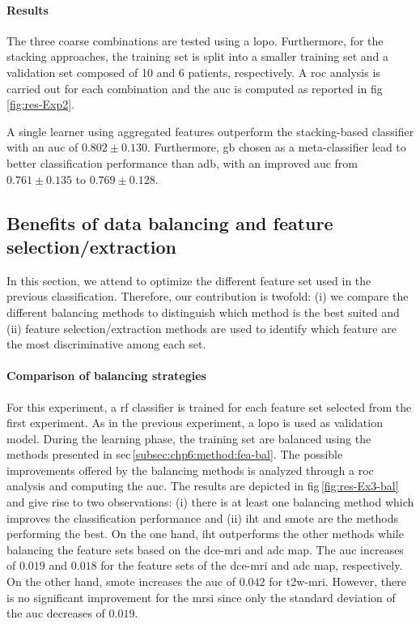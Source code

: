 \paragraph{Results}
The three coarse combinations are tested using a \ac{lopo}.
Furthermore, for the stacking approaches, the training set is split into a smaller training set and a validation set composed of 10 and 6 patients, respectively.
A \ac{roc} analysis is carried out for each combination and the \ac{auc} is computed as reported in \acs{fig}\,\ref{fig:res-Exp2}.

A single learner using aggregated features outperform the stacking-based classifier with an \ac{auc} of $0.802 \pm 0.130$.
Furthermore, \ac{gb} chosen as a meta-classifier lead to better classification performance than \ac{adb}, with an improved \ac{auc} from $0.761 \pm 0.135$ to $0.769 \pm 0.128$.

\subsection{Benefits of data balancing and feature selection/extraction}\label{subsec:chp6:exp-res:Ex3}

In this section, we attend to optimize the different feature set used in the previous classification.
Therefore, our contribution is twofold: (i) we compare the different balancing methods to distinguish which method is the best suited and (ii) feature selection/extraction methods are used to identify which feature are the most discriminative among each set.

\paragraph{Comparison of balancing strategies}
For this experiment, a \ac{rf} classifier is trained for each feature set selected from the first experiment.
As in the previous experiment, a \ac{lopo} is used as validation model.
During the learning phase, the training set are balanced using the methods presented in \acs{sec}\,\ref{subsec:chp6:method:fea-bal}.
The possible improvements offered by the balancing methods is analyzed through a \ac{roc} analysis and computing the \ac{auc}.
The results are depicted in \acs{fig}\,\ref{fig:res-Ex3-bal} and give rise to two observations:
(i) there is at least one balancing method which improves the classification performance and
(ii) \ac{iht} and \ac{smote} are the methods performing the best.
On the one hand, \ac{iht} outperforms the other methods while balancing the feature sets based on the \ac{dce}-\ac{mri} and \ac{adc} map.
The \ac{auc} increases of $0.019$ and $0.018$ for the feature sets of the \ac{dce}-\ac{mri} and \ac{adc} map, respectively.
On the other hand, \ac{smote} increases the \ac{auc} of $0.042$ for \ac{t2w}-\ac{mri}.
However, there is no significant improvement for the \ac{mrsi} since only the standard deviation of the \ac{auc} decreases of $0.019$.


